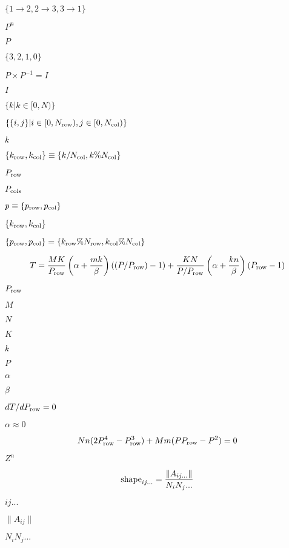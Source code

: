 \documentclass{article}
\begin{document}
$ \{ 1 \to 2, 2 \to 3, 3 \to 1 \} $
\pagebreak

$ P^n $
\pagebreak

$ P $
\pagebreak

$ \{3, 2, 1, 0 \} $
\pagebreak

$ P \times P^{-1} = I $
\pagebreak

$ I $
\pagebreak

$ \{ k | k \in [0,N) \} $
\pagebreak

$ \{ \{i,j\} | i \in [0,N_{\rm row}),j\in[0,N_{\rm col})\} $
\pagebreak

$ k $
\pagebreak

$ \{ k_{\rm row}, k_{\rm col} \} \equiv \{ k / N_{\rm col}, k \% N_{\rm col} \} $
\pagebreak

$ P_{\rm row} $
\pagebreak

$ P_{\rm cols} $
\pagebreak

$ p \equiv \{ p_{\rm row}, p_{\rm col} \} $
\pagebreak

$ \{ k_{\rm row}, k_{\rm col} \} $
\pagebreak

$ \{ p_{\rm row}, p_{\rm col} \} = \{ k_{\rm row} \% N_{\rm row}, k_{\rm col} \% N_{\rm col} \} $
\pagebreak

\[ T = \frac{MK}{P_{\rm{row}}} \left(\alpha + \frac{mk}{\beta}\right) \left((P/P_{\rm{row}}) - 1\right) + \frac{KN}{P/P_{\rm{row}}} \left(\alpha + \frac{kn}{\beta}\right) \left(P_{\rm{row}} - 1\right) \]
\pagebreak

$P_{\rm{row}}$
\pagebreak

$M$
\pagebreak

$N$
\pagebreak

$K$
\pagebreak

$k$
\pagebreak

$P$
\pagebreak

$\alpha$
\pagebreak

$\beta$
\pagebreak

$dT/dP_{\rm{row}} = 0$
\pagebreak

$\alpha \approx 0$
\pagebreak

\[ Nn(2 P_{\rm{row}}^4 - P_{\rm{row}}^3) + Mm(P P_{\rm{row}} - P^2) = 0 \]
\pagebreak

$ Z^n $
\pagebreak

\[ {\rm{shape}}_{ij...} = \frac{\|A_{ij...}\|}{N_i N_j ...} \]
\pagebreak

$ij...$
\pagebreak

$\|A_{ij}\|$
\pagebreak

$N_i N_j ...$
\pagebreak
\end{document}
